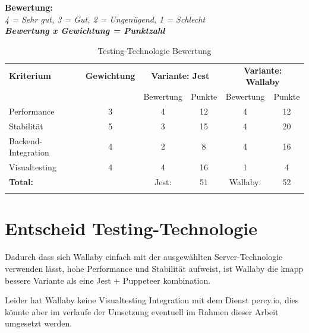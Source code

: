 \textbf{Bewertung:}\\
\textit{4 = Sehr gut, 3 = Gut, 2 = Ungenügend, 1 = Schlecht}\\


\textbf{\textit{Bewertung x Gewichtung = Punktzahl}}

\begin{longtable}[]{@{}p{2cm}ccccc@{}}
  \toprule
  \textbf{Kriterium}  & \textbf{Gewichtung} & \multicolumn{2}{c}{\textbf{Variante: Jest}} & \multicolumn{2}{c}{\textbf{Variante: Wallaby}}\tabularnewline
                      &                     & Bewertung                                   & Punkte                                                        & Bewertung & Punkte\tabularnewline
  \midrule
  \endhead
  Performance         & 3                   & 4                                           & 12                                                            & 4         & 12\tabularnewline
  Stabilität          & 5                   & 3                                           & 15                                                            & 4         & 20\tabularnewline
  Backend-Integration & 4                   & 2                                           & 8                                                             & 4         & 16\tabularnewline
  Visualtesting       & 4                   & 4                                           & 16                                                            & 1         & 4\tabularnewline
  \midrule
  \textbf{Total:}     &                     & Jest:                                       & 51                                                            & Wallaby:  & 52\tabularnewline
  \bottomrule
  \caption{Testing-Technologie Bewertung}
\end{longtable}

\section{Entscheid Testing-Technologie}\label{entscheid-testing-technologie}

Dadurch dass sich Wallaby einfach mit der ausgewählten Server-Technologie
verwenden lässt, hohe Performance und Stabilität aufweist, ist Wallaby die
knapp bessere Variante als eine Jest + Puppeteer kombination.

Leider hat Wallaby keine Visualtesting Integration mit dem Dienst percy.io,
dies könnte aber im verlaufe der Umsetzung eventuell im Rahmen dieser Arbeit
umgesetzt werden.

